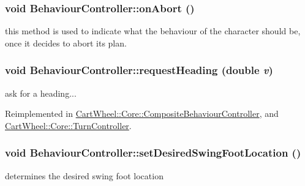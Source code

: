 \hypertarget{classCartWheel_1_1Core_1_1BehaviourController_ab6cb617fcd5939770b3a11b58ef757f3}{
\subsubsection[{onAbort}]{\setlength{\rightskip}{0pt plus 5cm}void BehaviourController::onAbort ()}}
\label{classCartWheel_1_1Core_1_1BehaviourController_ab6cb617fcd5939770b3a11b58ef757f3}
this method is used to indicate what the behaviour of the character should be, once it decides to abort its plan. \hypertarget{classCartWheel_1_1Core_1_1BehaviourController_a9a96dacbf508de76c84fcf494b49c4c9}{
\subsubsection[{requestHeading}]{\setlength{\rightskip}{0pt plus 5cm}void BehaviourController::requestHeading (double {\em v})}}
\label{classCartWheel_1_1Core_1_1BehaviourController_a9a96dacbf508de76c84fcf494b49c4c9}
ask for a heading... 

Reimplemented in \hyperlink{classCartWheel_1_1Core_1_1CompositeBehaviourController_a48cc3421fce61716da9686c9a351ed78}{CartWheel::Core::CompositeBehaviourController}, and \hyperlink{classCartWheel_1_1Core_1_1TurnController_a40ddbfce3d1b09956aeff59a17f1de6e}{CartWheel::Core::TurnController}.

\hypertarget{classCartWheel_1_1Core_1_1BehaviourController_a335b40febfbe741f290367a2ad59b38a}{
\subsubsection[{setDesiredSwingFootLocation}]{\setlength{\rightskip}{0pt plus 5cm}void BehaviourController::setDesiredSwingFootLocation ()}}
\label{classCartWheel_1_1Core_1_1BehaviourController_a335b40febfbe741f290367a2ad59b38a}
determines the desired swing foot location 

